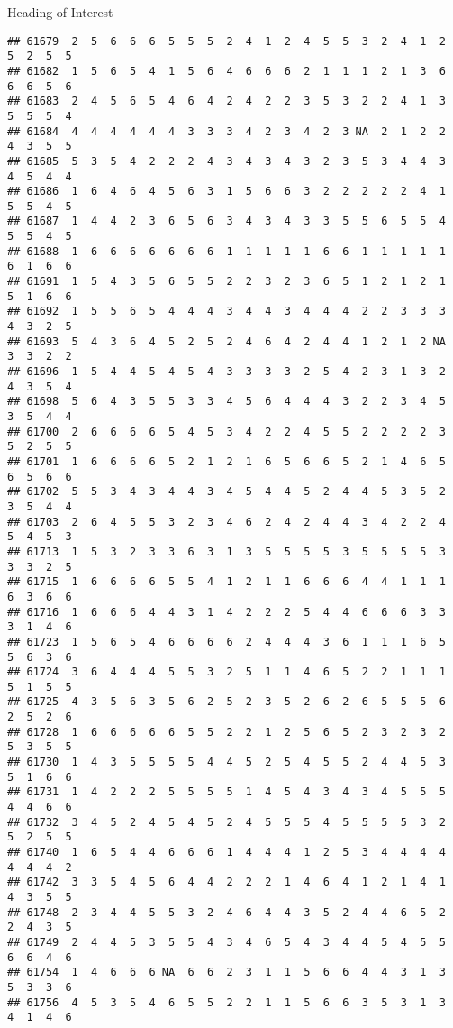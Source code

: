 \documentclass[
  ignorenonframetext,
]{beamer}
\begin{document}
\begin{frame}[fragile]{Heading of Interest}
\begin{verbatim}
## 61679  2  5  6  6  6  5  5  5  2  4  1  2  4  5  5  3  2  4  1  2  5  2  5  5
## 61682  1  5  6  5  4  1  5  6  4  6  6  6  2  1  1  1  2  1  3  6  6  6  5  6
## 61683  2  4  5  6  5  4  6  4  2  4  2  2  3  5  3  2  2  4  1  3  5  5  5  4
## 61684  4  4  4  4  4  4  3  3  3  4  2  3  4  2  3 NA  2  1  2  2  4  3  5  5
## 61685  5  3  5  4  2  2  2  4  3  4  3  4  3  2  3  5  3  4  4  3  4  5  4  4
## 61686  1  6  4  6  4  5  6  3  1  5  6  6  3  2  2  2  2  2  4  1  5  5  4  5
## 61687  1  4  4  2  3  6  5  6  3  4  3  4  3  3  5  5  6  5  5  4  5  5  4  5
## 61688  1  6  6  6  6  6  6  6  1  1  1  1  1  6  6  1  1  1  1  1  6  1  6  6
## 61691  1  5  4  3  5  6  5  5  2  2  3  2  3  6  5  1  2  1  2  1  5  1  6  6
## 61692  1  5  5  6  5  4  4  4  3  4  4  3  4  4  4  2  2  3  3  3  4  3  2  5
## 61693  5  4  3  6  4  5  2  5  2  4  6  4  2  4  4  1  2  1  2 NA  3  3  2  2
## 61696  1  5  4  4  5  4  5  4  3  3  3  3  2  5  4  2  3  1  3  2  4  3  5  4
## 61698  5  6  4  3  5  5  3  3  4  5  6  4  4  4  3  2  2  3  4  5  3  5  4  4
## 61700  2  6  6  6  6  5  4  5  3  4  2  2  4  5  5  2  2  2  2  3  5  2  5  5
## 61701  1  6  6  6  6  5  2  1  2  1  6  5  6  6  5  2  1  4  6  5  6  5  6  6
## 61702  5  5  3  4  3  4  4  3  4  5  4  4  5  2  4  4  5  3  5  2  3  5  4  4
## 61703  2  6  4  5  5  3  2  3  4  6  2  4  2  4  4  3  4  2  2  4  5  4  5  3
## 61713  1  5  3  2  3  3  6  3  1  3  5  5  5  5  3  5  5  5  5  3  3  3  2  5
## 61715  1  6  6  6  6  5  5  4  1  2  1  1  6  6  6  4  4  1  1  1  6  3  6  6
## 61716  1  6  6  6  4  4  3  1  4  2  2  2  5  4  4  6  6  6  3  3  3  1  4  6
## 61723  1  5  6  5  4  6  6  6  6  2  4  4  4  3  6  1  1  1  6  5  5  6  3  6
## 61724  3  6  4  4  4  5  5  3  2  5  1  1  4  6  5  2  2  1  1  1  5  1  5  5
## 61725  4  3  5  6  3  5  6  2  5  2  3  5  2  6  2  6  5  5  5  6  2  5  2  6
## 61728  1  6  6  6  6  6  5  5  2  2  1  2  5  6  5  2  3  2  3  2  5  3  5  5
## 61730  1  4  3  5  5  5  5  4  4  5  2  5  4  5  5  2  4  4  5  3  5  1  6  6
## 61731  1  4  2  2  2  5  5  5  5  1  4  5  4  3  4  3  4  5  5  5  4  4  6  6
## 61732  3  4  5  2  4  5  4  5  2  4  5  5  5  4  5  5  5  5  3  2  5  2  5  5
## 61740  1  6  5  4  4  6  6  6  1  4  4  4  1  2  5  3  4  4  4  4  4  4  4  2
## 61742  3  3  5  4  5  6  4  4  2  2  2  1  4  6  4  1  2  1  4  1  4  3  5  5
## 61748  2  3  4  4  5  5  3  2  4  6  4  4  3  5  2  4  4  6  5  2  2  4  3  5
## 61749  2  4  4  5  3  5  5  4  3  4  6  5  4  3  4  4  5  4  5  5  6  6  4  6
## 61754  1  4  6  6  6 NA  6  6  2  3  1  1  5  6  6  4  4  3  1  3  5  3  3  6
## 61756  4  5  3  5  4  6  5  5  2  2  1  1  5  6  6  3  5  3  1  3  4  1  4  6

\end{verbatim}
\end{frame}
\end{document}
